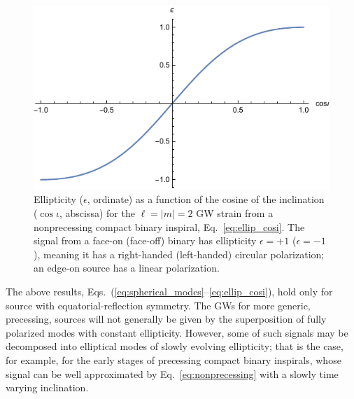 \documentclass[aps,prd,twocolumn,superscriptaddress,preprintnumbers,floatfix,nofootinbib]{revtex4-2}
\newcommand*{\eq}[1]{Eq.~\eqref{eq:#1}}
\begin{document}
\begin{figure}
\includegraphics[width=\columnwidth]{ellip_cosi}
\caption{Ellipticity ($\epsilon$, ordinate) as a function of the cosine of the inclination ($\cos\iota$, abscissa) for the $\ell = |m| = 2$ GW strain from a nonprecessing compact binary inspiral, Eq.~\eqref{eq:ellip_cosi}. The signal from a face-on (face-off) binary has ellipticity $\epsilon = +1$ ($\epsilon=-1$), meaning it has a right-handed (left-handed) circular polarization; an edge-on source has a linear polarization.}
\label{fig:ellip_cosi}
\end{figure}

The above results, Eqs.~(\ref{eq:spherical_modes}--\ref{eq:ellip_cosi}), hold only for source with equatorial-reflection symmetry.
The GWs for more generic, precessing, sources will not generally be given by the superposition of fully polarized modes with constant ellipticity.
However, some of such signals may be decomposed into elliptical modes of slowly evolving ellipticity; that is the case, for example, for the early stages of precessing compact binary inspirals, whose signal can be well approximated by \eq{nonprecessing} with a slowly time varying inclination.
\end{document}
